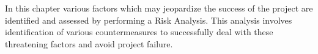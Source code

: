 In this chapter various factors which may jeopardize the success of the project are identified and assessed by performing a Risk Analysis. This analysis involves identification of various countermeasures to successfully deal with these threatening factors and avoid project failure.


